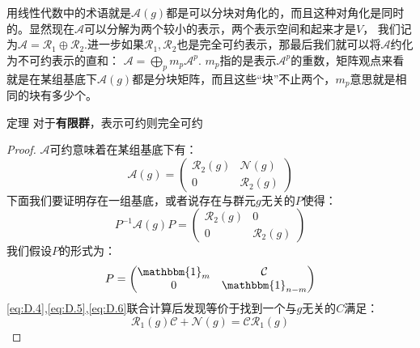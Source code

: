用线性代数中的术语就是$\mathcal{A}(g)$都是可以分块对角化的，而且这种对角化是同时的。显然现在$\mathscr{A}$可以分解为两个较小的表示，两个表示空间和起来才是$V$，
我们记为$\mathscr{A}=\mathscr{R}_1\oplus\mathscr{R}_2$.进一步如果$\mathscr{R}_1,\mathscr{R}_2$也是完全可约表示，那最后我们就可以将$\mathscr{A}$约化为不可约表示的直和：
$\mathscr{A}=\bigoplus_p m_p\mathscr{A}^p$. $m_p$指的是表示$\mathscr{A}^p$的重数，矩阵观点来看就是在某组基底下$\mathcal{A}(g)$都是分块矩阵，而且这些“块”不止两个，$m_p$意思就是相同的块有多少个。

\begin{theorem}{定理}
    对于\textbf{有限群}，表示可约则完全可约
\end{theorem}
\begin{proof}
    $\mathscr{A}$可约意味着在某组基底下有：
    \begin{equation}
        \label{eq:D.4}
        \mathcal{A}(g)=\begin{pmatrix}
            \mathcal{R}_2(g) & \mathcal{N}(g) \\
             {0} & \mathcal{R}_2(g)
           \end{pmatrix}
    \end{equation}
    下面我们要证明存在一组基底，或者说存在与群元$g$无关的$P$使得：
    \begin{equation}
        \label{eq:D.5}
        P^{-1}\mathcal{A}(g)P=\begin{pmatrix}
            \mathcal{R}_2(g) &{0} \\
             {0} & \mathcal{R}_2(g)
           \end{pmatrix}
    \end{equation}
    我们假设$P$的形式为：
    \begin{equation}
        \label{eq:D.6}
        P=\begin{pmatrix}
            \mathbbm{1}_m &\mathcal{C} \\
             {0} & \mathbbm{1}_{n-m}
           \end{pmatrix}
    \end{equation}
    \ref{eq:D.4},\ref{eq:D.5},\ref{eq:D.6}联合计算后发现等价于找到一个与$g$无关的$C$满足：
    \begin{equation}
        \label{eq:D.7}
        \mathcal{R}_1(g)\mathcal{C}+\mathcal{N}(g)=\mathcal{C}\mathcal{R}_1(g)
    \end{equation}
    

\end{proof}
